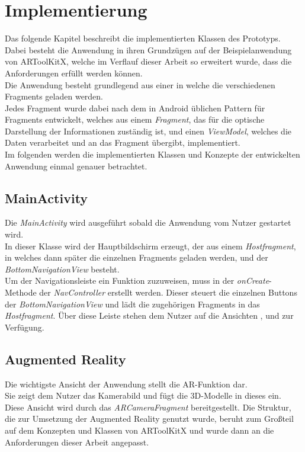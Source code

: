 \chapter{Implementierung}\label{chapter:implementierung}
Das folgende Kapitel beschreibt die implementierten Klassen des Prototyps.\\
Dabei besteht die Anwendung in ihren Grundzügen auf der Beispielanwendung von ARToolKitX, welche im Verflauf dieser Arbeit so erweitert wurde, dass die Anforderungen erfüllt werden können.\\
Die Anwendung besteht grundlegend aus einer \textit{} in welche die verschiedenen Fragments geladen werden.\\
Jedes Fragment wurde dabei nach dem in Android üblichen Pattern für Fragments entwickelt, welches aus einem \textit{Fragment}, das für die optische Darstellung der Informationen zuständig ist, und einen \textit{ViewModel}, welches die Daten verarbeitet und an das Fragment übergibt, implementiert.\\
Im folgenden werden die implementierten Klassen und Konzepte der entwickelten Anwendung einmal genauer betrachtet.

\section{MainActivity}\label{class:mainactivity}
Die \textit{MainActivity} wird ausgeführt sobald die Anwendung vom Nutzer gestartet wird.\\
In dieser Klasse wird der Hauptbildschirm erzeugt, der aus einem \textit{Hostfragment}, in welches dann später die einzelnen Fragments geladen werden, und der \textit{BottomNavigationView} besteht. \\
Um der Navigationsleiste ein Funktion zuzuweisen, muss in der \textit{onCreate}-Methode der \textit{NavController} erstellt werden. Dieser steuert die einzelnen Buttons der \textit{BottomNavigationView} und lädt die zugehörigen Fragments in das \textit{Hostfragment}. Über diese Leiste stehen dem Nutzer auf die Ansichten ,  und  zur Verfügung.


\section{Augmented Reality}\label{impl:ar}
Die wichtigste Ansicht der Anwendung stellt die AR-Funktion dar. \\ 
Sie zeigt dem Nutzer das Kamerabild und fügt die 3D-Modelle in dieses ein.\\
Diese Ansicht wird durch das \textit{ARCameraFragment} bereitgestellt.
Die Struktur, die zur Umsetzung der Augmented Reality genutzt wurde, beruht zum Großteil auf dem Konzepten und Klassen von ARToolKitX und wurde dann an die Anforderungen dieser Arbeit angepasst.

